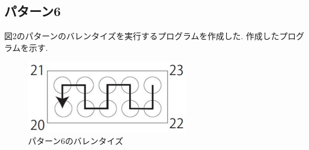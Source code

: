 \documentclass[10pt,a4j]{jsarticle}
\begin{document}
  \subsection{パターン6}
  図2のパターンのバレンタイズを実行するプログラムを作成した.
  作成したプログラムを示す.

    \begin{figure}[H]
      \centering

      \includegraphics[width=7cm]{../img/pattern6.png}
      \caption{パターン6のバレンタイズ}
    \end{figure}
\end{document}
